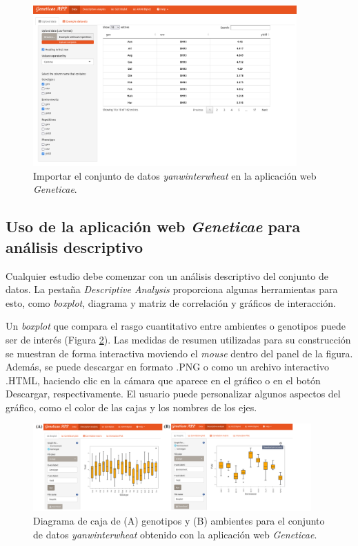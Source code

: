  \begin{figure}[h]
	\begin{center}
		\includegraphics[width=0.9\textwidth]{./Graficos/www/Data.png}
	\end{center}
	\caption{Importar el conjunto de datos \emph{yanwinterwheat} en la aplicación web \emph{Geneticae}.}
	\label{fig:fig431}
\end{figure}

\hspace{1cm}

\subsection{Uso de la aplicación web \emph{Geneticae} para análisis descriptivo}

Cualquier estudio debe comenzar con un análisis descriptivo del conjunto de datos. La pestaña \emph{Descriptive Analysis} proporciona algunas herramientas para esto, como  \emph{boxplot}, diagrama y matriz de correlación y gráficos de interacción.

Un \emph{boxplot} que compara el rasgo cuantitativo entre ambientes o genotipos puede ser de interés (Figura \ref{fig:figdesc1}). Las medidas de resumen utilizadas para su construcción se muestran de forma interactiva moviendo el \emph{mouse} dentro del panel de la figura. Además, se puede descargar en formato .PNG o como un archivo interactivo .HTML, haciendo clic en la cámara que aparece en el gráfico o en el botón Descargar, respectivamente. El usuario puede personalizar algunos aspectos del gráfico, como el color de las cajas y los nombres de los ejes. 

\begin{figure}[h]
	\begin{center}
		\includegraphics[width=0.95\textwidth]{./Graficos/www/boxplot.png}
	\end{center}
	\caption{Diagrama de caja de (A) genotipos y (B) ambientes para el conjunto de datos \emph{yanwinterwheat} obtenido con la aplicación web \emph{Geneticae}.}
	\label{fig:figdesc1}
\end{figure}


